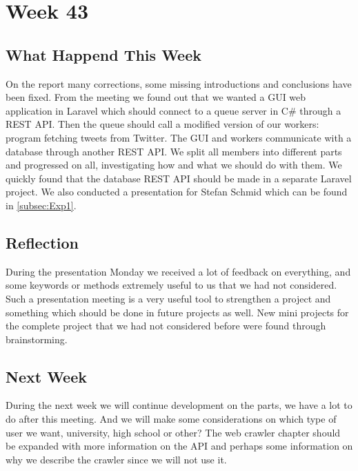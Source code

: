 \section*{Week 43}\label{Week43}
\subsection*{What Happend This Week}
On the report many corrections, some missing introductions and conclusions have
been fixed. From the meeting we found out that we wanted a \ac{GUI} web
application in Laravel which should connect to a
queue server in C\# through a \ac{REST} \ac{API}\citep{laravelIntro}. Then the queue
should call a modified version of our workers: program fetching tweets from Twitter. The
\ac{GUI} and workers communicate with a database through another \ac{REST}
\ac{API}. We split all members into different parts and progressed on all,
investigating how and what we should do with them. We quickly found that the
database \ac{REST} \ac{API} should be made in a separate Laravel project. We
also conducted a presentation for Stefan Schmid which can be found in
\autoref{subsec:Exp1}.

\subsection*{Reflection}
During the presentation Monday we received a lot of feedback on everything, and
some keywords or methods extremely useful to us that we had not considered. Such
a presentation meeting is a very useful tool to strengthen a project and
something which should be done in future projects as well. New mini projects for
the complete project that we had not considered before were found through
brainstorming.

\subsection*{Next Week}
During the next week we will continue development on the parts, we have a lot to
do after this meeting. And we will make some considerations on which type of
user we want, university, high school or other? 
The web crawler chapter should be expanded with more information on the \ac{API}
and perhaps some information on why we describe the crawler since we will not
use it.


